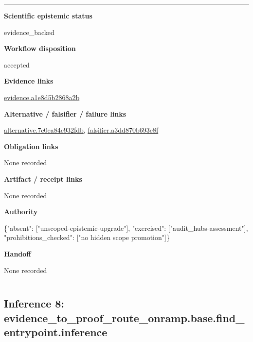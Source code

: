 \documentclass[10pt,a4paper]{article}
\newcommand{\TraceField}[2]{\par\noindent\textbf{#1}\par\noindent #2\par\smallskip}
\newenvironment{TraceDossier}{\par\medskip\noindent\hrule\medskip}{\medskip\hrule\par\medskip}
\begin{document}
\begin{TraceDossier}
\TraceField{Scientific epistemic status}{evidence\_\allowbreak{}backed}

\TraceField{Workflow disposition}{accepted}

\TraceField{Evidence links}{\hyperlink{trace-evidence-3af59c1fcd3b33ab14}{evidence.\allowbreak{}a1e8d5b286\allowbreak{}8a2b}}

\TraceField{Alternative / falsifier / failure links}{\hyperlink{trace-alternative-0220e2fde64269a607}{alternativ\allowbreak{}e.\allowbreak{}7c0ea84c93\allowbreak{}2fdb}, \hyperlink{trace-alternative-9fc59246382c59c0a9}{falsifier.\allowbreak{}a3dd870b69\allowbreak{}3e8f}}

\TraceField{Obligation links}{None recorded}

\TraceField{Artifact / receipt links}{None recorded}

\TraceField{Authority}{\{"absent":\allowbreak{} ["unscoped\allowbreak{}-\allowbreak{}epistemic-\allowbreak{}upgrade"],\allowbreak{} "exercised\allowbreak{}":\allowbreak{} ["audit\_\allowbreak{}hubs-\allowbreak{}assessment\allowbreak{}"], "prohibiti\allowbreak{}ons\_\allowbreak{}checked":\allowbreak{} ["no hidden scope promotion"\allowbreak{}]\}}

\TraceField{Handoff}{None recorded}

\end{TraceDossier}
\pagebreak[2]\subsection{Inference 8: evidence\_\allowbreak{}to\_\allowbreak{}proof\_\allowbreak{}route\_\allowbreak{}onramp.\allowbreak{}base.\allowbreak{}find\_\allowbreak{}entrypoint\allowbreak{}.\allowbreak{}inference}\label{trace-inference-8c74692789be42ce26}
\end{document}
